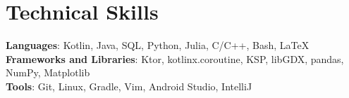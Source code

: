 \documentclass[letterpaper,11pt]{article}
\begin{document}
%
\section{Technical Skills}
 \begin{itemize}[leftmargin=0.15in, label={}]
    \small{\item{
     \textbf{Languages}{: Kotlin, Java, SQL, Python, Julia, C/C++, Bash, LaTeX} \\
     \textbf{Frameworks and Libraries}{: Ktor, kotlinx.coroutine, KSP, libGDX, pandas, NumPy, Matplotlib} \\
     \textbf{Tools}{: Git, Linux, Gradle, Vim, Android Studio, IntelliJ} \\
    }}
 \end{itemize}


\end{document}

